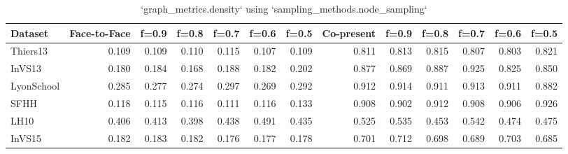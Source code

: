 \begin{table}[ht]
\begin{tabular}{lrrrrrrrrrrrr}
\hline
 Dataset    &   Face-to-Face &   f=0.9 &   f=0.8 &   f=0.7 &   f=0.6 &   f=0.5 &   Co-present &   f=0.9 &   f=0.8 &   f=0.7 &   f=0.6 &   f=0.5 \\
\hline
 Thiers13   &          0.109 &   0.109 &   0.110 &   0.115 &   0.107 &   0.109 &        0.811 &   0.813 &   0.815 &   0.807 &   0.803 &   0.821 \\
 InVS13     &          0.180 &   0.184 &   0.168 &   0.188 &   0.182 &   0.202 &        0.877 &   0.869 &   0.887 &   0.925 &   0.825 &   0.850 \\
 LyonSchool &          0.285 &   0.277 &   0.274 &   0.297 &   0.269 &   0.292 &        0.912 &   0.914 &   0.911 &   0.913 &   0.911 &   0.882 \\
 SFHH       &          0.118 &   0.115 &   0.116 &   0.111 &   0.116 &   0.133 &        0.908 &   0.902 &   0.912 &   0.908 &   0.906 &   0.926 \\
 LH10       &          0.406 &   0.413 &   0.398 &   0.438 &   0.491 &   0.435 &        0.525 &   0.535 &   0.453 &   0.542 &   0.474 &   0.475 \\
 InVS15     &          0.182 &   0.183 &   0.182 &   0.176 &   0.177 &   0.178 &        0.701 &   0.712 &   0.698 &   0.689 &   0.703 &   0.685 \\
\hline
\end{tabular}
\caption{`graph_metrics.density` using `sampling_methods.node_sampling`}
\end{table}